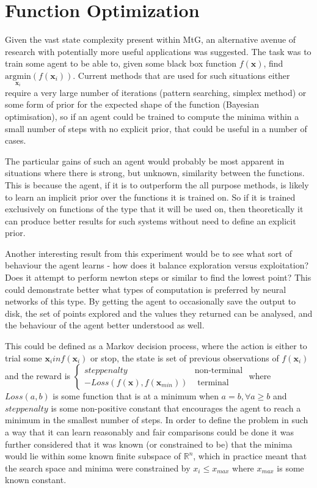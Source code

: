 \section{Function Optimization}
Given the vast state complexity present within MtG, an alternative avenue of research with potentially more useful applications was suggested. The task was to train some agent to be able to, given some black box function $f(\boldsymbol{x})$, find $\underset{\boldsymbol{x}_i}{\text{argmin}} (f(\boldsymbol{x}_i))$. Current methods that are used for such situations either require a very large number of iterations (pattern searching, simplex method) or some form of prior for the expected shape of the function (Bayesian optimisation), so if an agent could be trained to compute the minima within a small number of steps with no explicit prior, that could be useful in a number of cases.

The particular gains of such an agent would probably be most apparent in situations where there is strong, but unknown, similarity between the functions. This is because the agent, if it is to outperform the all purpose methods, is likely to learn an implicit prior over the functions it is trained on. So if it is trained exclusively on functions of the type that it will be used on, then theoretically it can produce better results for such systems without need to define an explicit prior.

Another interesting result from this experiment would be to see what sort of behaviour the agent learns - how does it balance exploration versus exploitation? Does it attempt to perform newton steps or similar to find the lowest point? This could demonstrate better what types of computation is preferred by neural networks of this type. By getting the agent to occasionally save the output to disk, the set of points explored and the values they returned can be analysed, and the behaviour of the agent better understood as well.


This could be defined as  a Markov decision process, where the action is either to trial some $\boldsymbol{x}_i in f(\boldsymbol{x}_i)$ or stop, the state is set of previous observations of $f(\boldsymbol{x}_i)$ and the reward is $\begin{cases}
 step penalty&  \text{non-terminal} \\
-Loss(f(\boldsymbol{x}), f(\boldsymbol{x}_{min})) & \text{ terminal}
\end{cases} $ where $Loss(a,b)$ is some function that is at a minimum when $a = b, \forall a \geq b$ and $step penalty$ is some non-positive constant that encourages the agent to reach a minimum in the smallest number of steps. 
In order to define the problem in such a way that it can learn reasonably and fair comparisons could be done it was further considered that it was known (or constrained to be) that the minima would lie within some known finite subspace of $\mathbb{R}^n$, which in practice meant that the search space and minima were constrained by $x_i \leq x_{max}$ where $x_{max}$ is some known constant.

